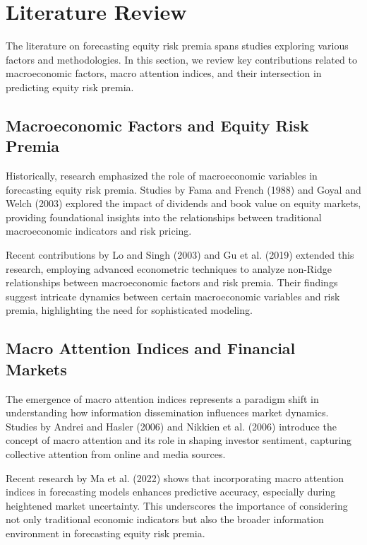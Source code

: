 \documentclass{article}
\begin{document}
\section{Literature Review}

The literature on forecasting equity risk premia spans studies exploring various factors and methodologies. In this section, we review key contributions related to macroeconomic factors, macro attention indices, and their intersection in predicting equity risk premia.

\subsection{Macroeconomic Factors and Equity Risk Premia}

Historically, research emphasized the role of macroeconomic variables in forecasting equity risk premia. Studies by Fama and French (1988) and Goyal and Welch (2003) explored the impact of dividends and book value on equity markets, providing foundational insights into the relationships between traditional macroeconomic indicators and risk pricing.

Recent contributions by Lo and Singh (2003) and Gu et al. (2019) extended this research, employing advanced econometric techniques to analyze non-Ridge relationships between macroeconomic factors and risk premia. Their findings suggest intricate dynamics between certain macroeconomic variables and risk premia, highlighting the need for sophisticated modeling.

\subsection{Macro Attention Indices and Financial Markets}

The emergence of macro attention indices represents a paradigm shift in understanding how information dissemination influences market dynamics. Studies by Andrei and Hasler (2006) and Nikkien et al. (2006) introduce the concept of macro attention and its role in shaping investor sentiment, capturing collective attention from online and media sources.

Recent research by Ma et al. (2022) shows that incorporating macro attention indices in forecasting models enhances predictive accuracy, especially during heightened market uncertainty. This underscores the importance of considering not only traditional economic indicators but also the broader information environment in forecasting equity risk premia.
\end{document}
